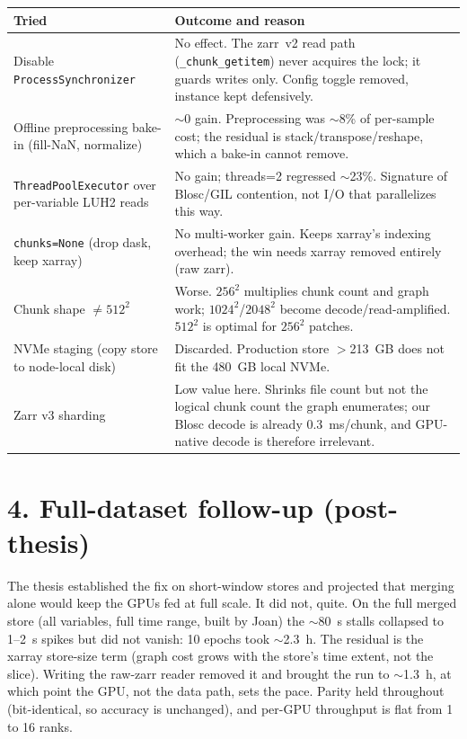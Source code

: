\documentclass[11pt,a4paper]{article}
\begin{document}
\begin{table}[ht]
\centering\small
\begin{tabular}{@{}p{4.5cm}p{10.6cm}@{}}
\toprule
\textbf{Tried} & \textbf{Outcome and reason} \\
\midrule
Disable \texttt{ProcessSynchronizer} &
  No effect. The zarr~v2 read path (\texttt{\_chunk\_getitem}) never acquires the lock; it guards
  writes only. Config toggle removed, instance kept defensively. \\
Offline preprocessing bake-in (fill-NaN, normalize) &
  $\sim$0 gain. Preprocessing was $\sim$8\% of per-sample cost; the residual is
  stack/transpose/reshape, which a bake-in cannot remove. \\
\texttt{ThreadPoolExecutor} over per-variable LUH2 reads &
  No gain; threads=2 regressed $\sim$23\%. Signature of Blosc/GIL contention, not I/O that
  parallelizes this way. \\
\texttt{chunks=None} (drop dask, keep xarray) &
  No multi-worker gain. Keeps xarray's indexing overhead; the win needs xarray removed entirely
  (raw zarr). \\
Chunk shape $\ne 512^2$ &
  Worse. $256^2$ multiplies chunk count and graph work; $1024^2$/$2048^2$ become decode/read-amplified.
  $512^2$ is optimal for $256^2$ patches. \\
NVMe staging (copy store to node-local disk) &
  Discarded. Production store $>$213~GB does not fit the 480~GB local NVMe. \\
Zarr v3 sharding &
  Low value here. Shrinks file count but not the logical chunk count the graph enumerates; our Blosc
  decode is already 0.3~ms/chunk, and GPU-native decode is therefore irrelevant. \\
\bottomrule
\end{tabular}
\end{table}

\newpage

\section*{4. Full-dataset follow-up (post-thesis)}

The thesis established the fix on short-window stores and projected that merging alone would keep the
GPUs fed at full scale. It did not, quite. On the full merged store (all variables, full time range,
built by Joan) the $\sim$80~s stalls collapsed to 1--2~s spikes but did not vanish: 10 epochs took
$\sim$2.3~h. The residual is the xarray store-size term (graph cost grows with the store's time extent,
not the slice). Writing the raw-zarr reader removed it and brought the run to $\sim$1.3~h, at which point
the GPU, not the data path, sets the pace. Parity held throughout (bit-identical, so accuracy is
unchanged), and per-GPU throughput is flat from 1 to 16 ranks.
\end{document}
